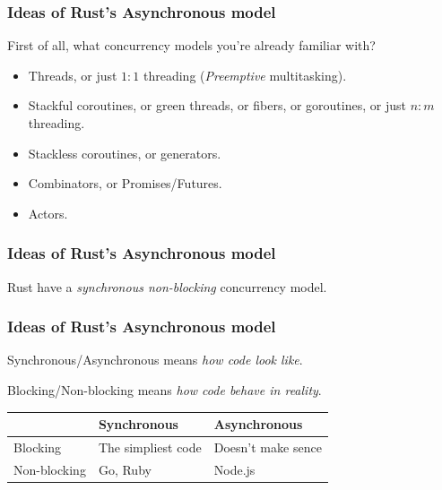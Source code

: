 \documentclass[aspectratio=1610,t]{beamer}
\begin{document}

\begin{frame}[fragile]
\frametitle{Ideas of Rust's Asynchronous model}
First of all, what concurrency models you're already familiar with?

\begin{itemize}
    \item<2-> Threads, or just $1:1$ threading (\textit{Preemptive} multitasking).
    \item<3-> Stackful coroutines, or green threads, or fibers, or goroutines, or just $n:m$ threading.
    \item<4-> Stackless coroutines, or generators.
    \item<5-> Combinators, or Promises/Futures.
    \item<6-> Actors.
\end{itemize}
\end{frame}


\begin{frame}[fragile]
\frametitle{Ideas of Rust's Asynchronous model}
Rust have a \textit{synchronous non-blocking} concurrency model.

\end{frame}


\begin{frame}[fragile]
\frametitle{Ideas of Rust's Asynchronous model}
Synchronous/Asynchronous means \textit{how code look like}.

Blocking/Non-blocking means \textit{how code behave in reality}.

\begin{table}[]
\begin{tabular}{l|l|l|}
\cline{2-3}
                                   & Synchronous        & Asynchronous       \\ \hline
\multicolumn{1}{|l|}{Blocking}     & The simpliest code & Doesn't make sence \\ \hline
\multicolumn{1}{|l|}{Non-blocking} & Go, Ruby           & Node.js            \\ \hline
\end{tabular}
\end{table}

\end{frame}
\end{document}
